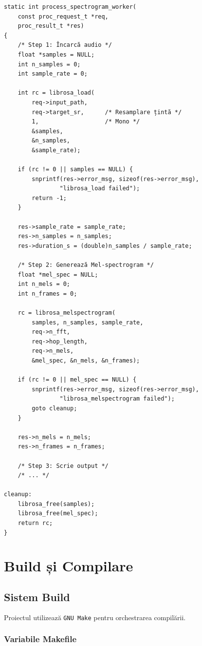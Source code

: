 \documentclass[12pt,a4paper,oneside]{book}
\begin{document}
\begin{lstlisting}[caption=Procesare audio în worker]
static int process_spectrogram_worker(
    const proc_request_t *req,
    proc_result_t *res)
{
    /* Step 1: Încarcă audio */
    float *samples = NULL;
    int n_samples = 0;
    int sample_rate = 0;
    
    int rc = librosa_load(
        req->input_path,
        req->target_sr,      /* Resamplare țintă */
        1,                   /* Mono */
        &samples,
        &n_samples,
        &sample_rate);
    
    if (rc != 0 || samples == NULL) {
        snprintf(res->error_msg, sizeof(res->error_msg),
                "librosa_load failed");
        return -1;
    }
    
    res->sample_rate = sample_rate;
    res->n_samples = n_samples;
    res->duration_s = (double)n_samples / sample_rate;
    
    /* Step 2: Generează Mel-spectrogram */
    float *mel_spec = NULL;
    int n_mels = 0;
    int n_frames = 0;
    
    rc = librosa_melspectrogram(
        samples, n_samples, sample_rate,
        req->n_fft,
        req->hop_length,
        req->n_mels,
        &mel_spec, &n_mels, &n_frames);
    
    if (rc != 0 || mel_spec == NULL) {
        snprintf(res->error_msg, sizeof(res->error_msg),
                "librosa_melspectrogram failed");
        goto cleanup;
    }
    
    res->n_mels = n_mels;
    res->n_frames = n_frames;
    
    /* Step 3: Scrie output */
    /* ... */
    
cleanup:
    librosa_free(samples);
    librosa_free(mel_spec);
    return rc;
}
\end{lstlisting}

\newpage

\chapter{Build și Compilare}

\section{Sistem Build}

Proiectul utilizează \texttt{GNU Make} pentru orchestrarea compilării.

\subsection{Variabile Makefile}
\end{document}
